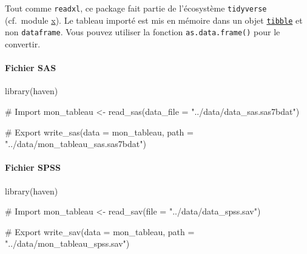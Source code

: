 \documentclass[
  letterpaper,
  DIV=11,
  numbers=noendperiod]{scrartcl}
\let\oldparagraph\paragraph
\renewcommand{\paragraph}[1]{\oldparagraph{#1}\mbox{}}
\newenvironment{Shaded}{\begin{snugshade}}{\end{snugshade}}
\newcommand{\AttributeTok}[1]{\textcolor[rgb]{0.40,0.45,0.13}{#1}}
\newcommand{\CommentTok}[1]{\textcolor[rgb]{0.37,0.37,0.37}{#1}}
\newcommand{\FunctionTok}[1]{\textcolor[rgb]{0.28,0.35,0.67}{#1}}
\newcommand{\NormalTok}[1]{\textcolor[rgb]{0.00,0.23,0.31}{#1}}
\newcommand{\OtherTok}[1]{\textcolor[rgb]{0.00,0.23,0.31}{#1}}
\newcommand{\StringTok}[1]{\textcolor[rgb]{0.13,0.47,0.30}{#1}}
\begin{document}
\begin{tcolorbox}[enhanced jigsaw, colframe=quarto-callout-important-color-frame, bottomtitle=1mm, colback=white, leftrule=.75mm, breakable, left=2mm, titlerule=0mm, toptitle=1mm, arc=.35mm, title=\textcolor{quarto-callout-important-color}{\faExclamation}\hspace{0.5em}{Important}, rightrule=.15mm, bottomrule=.15mm, toprule=.15mm, colbacktitle=quarto-callout-important-color!10!white, opacitybacktitle=0.6, opacityback=0, coltitle=black]

Tout comme \texttt{readxl}, ce package fait partie de l'écosystème
\texttt{tidyverse} (cf.~module \href{}{x}). Le tableau importé est mis
en mémoire dans un objet
\href{https://tibble.tidyverse.org/}{\texttt{tibble}} et non
\texttt{dataframe}. Vous pouvez utiliser la fonction
\texttt{as.data.frame()} pour le convertir.

\end{tcolorbox}

\hypertarget{fichier-sas}{%
\paragraph{Fichier SAS}\label{fichier-sas}}

\begin{Shaded}
\begin{Highlighting}[]
\FunctionTok{library}\NormalTok{(haven)}

\CommentTok{\# Import}
\NormalTok{mon\_tableau  }\OtherTok{\textless{}{-}} \FunctionTok{read\_sas}\NormalTok{(}\AttributeTok{data\_file =} \StringTok{"../data/data\_sas.sas7bdat"}\NormalTok{)}

\CommentTok{\# Export}
\FunctionTok{write\_sas}\NormalTok{(}\AttributeTok{data =}\NormalTok{ mon\_tableau, }\AttributeTok{path =} \StringTok{"../data/mon\_tableau\_sas.sas7bdat"}\NormalTok{)}
\end{Highlighting}
\end{Shaded}

\hypertarget{fichier-spss}{%
\paragraph{Fichier SPSS}\label{fichier-spss}}

\begin{Shaded}
\begin{Highlighting}[]
\FunctionTok{library}\NormalTok{(haven)}

\CommentTok{\# Import}
\NormalTok{mon\_tableau  }\OtherTok{\textless{}{-}} \FunctionTok{read\_sav}\NormalTok{(}\AttributeTok{file =}  \StringTok{"../data/data\_spss.sav"}\NormalTok{)}

\CommentTok{\# Export}
\FunctionTok{write\_sav}\NormalTok{(}\AttributeTok{data =}\NormalTok{ mon\_tableau, }\AttributeTok{path =}  \StringTok{"../data/mon\_tableau\_spss.sav"}\NormalTok{)}
\end{Highlighting}
\end{Shaded}
\end{document}
